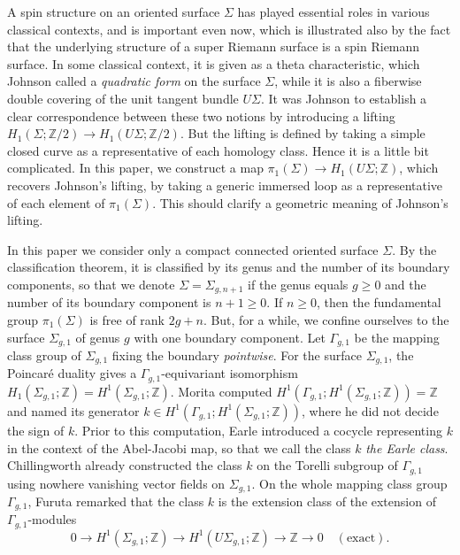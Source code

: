 \documentclass[a4paper,12pt, twoside]{amsart}
\theoremstyle{definition}
\theoremstyle{remark}
\numberwithin{equation}{section}
\newcommand\bZ{{\mathbb{Z}}}
\begin{document}
A spin structure on an oriented surface $\Sigma$ has played essential roles in various  classical contexts, and is important even now, which is illustrated also by the fact that the underlying structure of a super Riemann surface is a spin Riemann surface. In some classical context, it is given as a theta characteristic, which Johnson \cite{J80a} called a {\it quadratic form} on the surface $\Sigma$, while it is also a fiberwise double covering of the unit tangent bundle $U\Sigma$. It was Johnson \cite{J80a} to establish a clear correspondence between these two notions by introducing a lifting $H_1(\Sigma; \bZ/2) \to H_1(U\Sigma; \bZ/2)$. But the lifting is defined by taking a simple closed curve as a representative of each homology class. Hence it is a little bit complicated. 
In this paper, we construct a map $\pi_1(\Sigma) \to H_1(U\Sigma; \bZ)$, which recovers Johnson's lifting, by taking a generic immersed loop as a representative of each element of $\pi_1(\Sigma)$. This should clarify a geometric meaning of Johnson's lifting. \par
In this paper we consider only a compact connected oriented surface $\Sigma$. 
By the classification theorem, it is classified by its genus and the number of its boundary components, so that we denote $\Sigma = \Sigma_{g, n+1}$ if the genus equals $g \geq 0$ and the number of its boundary component is $n+1 \geq 0$. 
If $n \geq 0$, then the fundamental group $\pi_1(\Sigma)$ is free of rank $2g+n$. 
But, for a while, we confine ourselves to the surface $\Sigma_{g,1}$ of genus $g$ with one boundary component. Let $\Gamma_{g,1}$ be the mapping class group of $\Sigma_{g,1}$ fixing the boundary {\it pointwise}. 
For the surface $\Sigma_{g,1}$, the Poincar\'e duality gives a $\Gamma_{g,1}$-equivariant isomorphism $H_1(\Sigma_{g,1}; \bZ) = H^1(\Sigma_{g,1}; \bZ)$.  Morita \cite{Mo89} computed 
$H^1(\Gamma_{g,1}; H^1(\Sigma_{g,1}; \bZ)) = \bZ$ and named its generator $k \in H^1(\Gamma_{g,1}; H^1(\Sigma_{g,1}; \bZ))$, where he did not decide the sign of $k$. Prior to this computation, Earle \cite{E78} introduced a cocycle representing $k$ in the context of the Abel-Jacobi map, so that 
we call the class $k$ {\it the Earle class}. 
Chillingworth \cite{C72a, C72b} already constructed the class $k$ on the Torelli subgroup of $\Gamma_{g,1}$ using nowhere vanishing vector fields on $\Sigma_{g,1}$. 
On the whole mapping class group $\Gamma_{g,1}$, 
Furuta \cite[p.569]{Mo97} remarked that the class $k$ is the extension class of the extension of $\Gamma_{g,1}$-modules
$$
0 \to H^1(\Sigma_{g,1}; \bZ)  \to H^1(U\Sigma_{g,1}; \bZ) \to \bZ \to  0
\quad (\text{exact}).
$$
\end{document}
